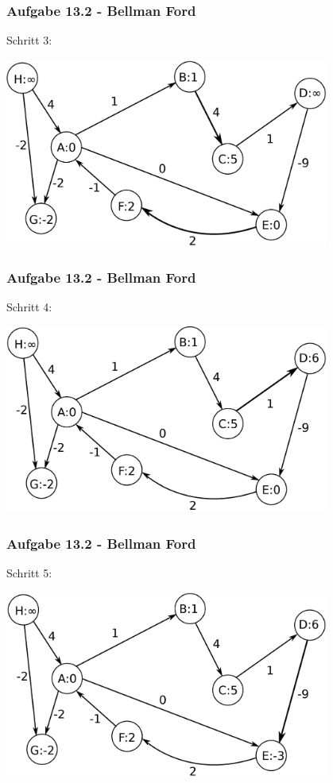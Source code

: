 \documentclass{beamer}
\begin{document}
\begin{frame}
	\frametitle{Aufgabe 13.2 - Bellman Ford}
	Schritt 3:
	\begin{center}
		\includegraphics[width=0.8\textwidth]{images/bellman_ford2.png}
	\end{center}
\end{frame}

\begin{frame}
	\frametitle{Aufgabe 13.2 - Bellman Ford}
	Schritt 4:
	\begin{center}
		\includegraphics[width=0.8\textwidth]{images/bellman_ford3.png}
	\end{center}
\end{frame}

\begin{frame}
	\frametitle{Aufgabe 13.2 - Bellman Ford}
	Schritt 5:
	\begin{center}
		\includegraphics[width=0.8\textwidth]{images/bellman_ford4.png}
	\end{center}
\end{frame}
\end{document}
